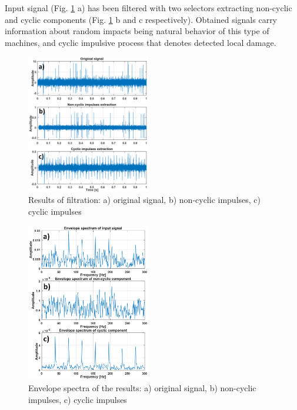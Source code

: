 \documentclass[conference]{IEEEtran}
\begin{document}
Input signal (Fig. \ref{fig: outplots} a) has been filtered with two selectors extracting non-cyclic and cyclic components (Fig. \ref{fig: outplots} b and c respectively). Obtained signals carry information about random impacts being natural behavior of this type of machines, and cyclic impulsive process that denotes detected local damage.

\begin{figure}[!ht]
\centering
\includegraphics[width = 0.48\textwidth]{figs/output_plots.png}
\caption{Results of filtration: a) original signal, b) non-cyclic impulses, c) cyclic impulses}
\label{fig: outplots}
\end{figure}

\begin{figure}[!ht]
\centering
\includegraphics[width = 0.48\textwidth]{figs/output_specs2.png}
\caption{Envelope spectra of the results: a) original signal, b) non-cyclic impulses, c) cyclic impulses}
\label{fig: outspecs}
\end{figure}
\end{document}

